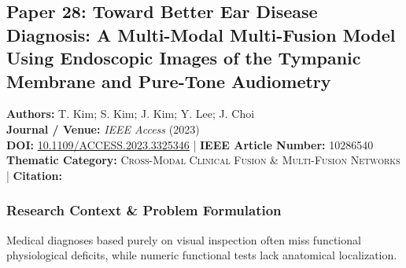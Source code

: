 \subsection{Paper 28: Toward Better Ear Disease Diagnosis: A Multi-Modal Multi-Fusion Model Using Endoscopic Images of the Tympanic Membrane and Pure-Tone Audiometry}
\label{sec:paper_28}

\begin{tcolorbox}[colback=gray!5!white,colframe=gray!75!black,title=\textbf{Metadata \& Citation Summary}]
\textbf{Authors:} T. Kim; S. Kim; J. Kim; Y. Lee; J. Choi \\
\textbf{Journal / Venue:} \textit{IEEE Access} (2023) \\
\textbf{DOI:} \href{https://doi.org/10.1109/ACCESS.2023.3325346}{10.1109/ACCESS.2023.3325346} \quad | \quad \textbf{IEEE Article Number:} 10286540 \\
\textbf{Thematic Category:} \textsc{Cross-Modal Clinical Fusion \& Multi-Fusion Networks} \quad | \quad \textbf{Citation:} \cite{10286540}
\end{tcolorbox}

\subsubsection*{Research Context \& Problem Formulation}
Medical diagnoses based purely on visual inspection often miss functional physiological deficits, while numeric functional tests lack anatomical localization.

